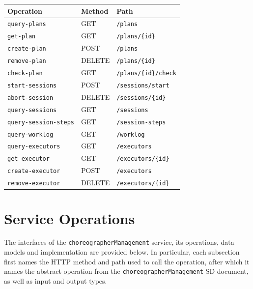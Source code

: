 \documentclass[a4paper]{arrowhead}
\begin{document}
\noindent\begin{longtable}{| p{5.2cm} | p{1.6cm} | p{8.4cm} |} \hline
\rowcolor{gray!33} Operation & Method & Path \\ \hline \endhead
\texttt{query-\allowbreak{}plans} & GET & \texttt{/\allowbreak{}plans} \\ \hline
\texttt{get-\allowbreak{}plan} & GET & \texttt{/\allowbreak{}plans/\allowbreak{}\{id\}} \\ \hline
\texttt{create-\allowbreak{}plan} & POST & \texttt{/\allowbreak{}plans} \\ \hline
\texttt{remove-\allowbreak{}plan} & DELETE & \texttt{/\allowbreak{}plans/\allowbreak{}\{id\}} \\ \hline
\texttt{check-\allowbreak{}plan} & GET & \texttt{/\allowbreak{}plans/\allowbreak{}\{id\}/\allowbreak{}check} \\ \hline
\texttt{start-\allowbreak{}sessions} & POST & \texttt{/\allowbreak{}sessions/\allowbreak{}start} \\ \hline
\texttt{abort-\allowbreak{}session} & DELETE & \texttt{/\allowbreak{}sessions/\allowbreak{}\{id\}} \\ \hline
\texttt{query-\allowbreak{}sessions} & GET & \texttt{/\allowbreak{}sessions} \\ \hline
\texttt{query-\allowbreak{}session-\allowbreak{}steps} & GET & \texttt{/\allowbreak{}session-\allowbreak{}steps} \\ \hline
\texttt{query-\allowbreak{}worklog} & GET & \texttt{/\allowbreak{}worklog} \\ \hline
\texttt{query-\allowbreak{}executors} & GET & \texttt{/\allowbreak{}executors} \\ \hline
\texttt{get-\allowbreak{}executor} & GET & \texttt{/\allowbreak{}executors/\allowbreak{}\{id\}} \\ \hline
\texttt{create-\allowbreak{}executor} & POST & \texttt{/\allowbreak{}executors} \\ \hline
\texttt{remove-\allowbreak{}executor} & DELETE & \texttt{/\allowbreak{}executors/\allowbreak{}\{id\}} \\ \hline
\end{longtable}

\newpage

\section{Service Operations}
\label{sec:operations}

The interfaces of the \texttt{choreographer\allowbreak{}Management} service, its operations, data models and implementation are provided below.
In particular, each subsection first names the HTTP method and path used to call the operation, after which it names the abstract operation from the \texttt{choreographer\allowbreak{}Management} SD document, as well as input and output types.
\end{document}
